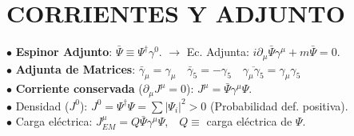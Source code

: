 
\section{CORRIENTES Y ADJUNTO}
$\bullet$ \textbf{Espinor Adjunto}: $\bar{\Psi} \equiv \Psi^\dagger \gamma^0$.
$\rightarrow$ Ec. Adjunta: $i\partial_\mu \bar{\Psi} \gamma^\mu + m\bar{\Psi} = 0$.
\\
$\bullet$ \textbf{Adjunta de Matrices}: $\bar{\gamma}_\mu= \gamma _\mu \quad \bar{\gamma}_5 = - \gamma_5 \quad \overline{\gamma_\mu \gamma_5} = \gamma_\mu \gamma_5$
\\$\bullet$ \textbf{Corriente conservada} ($\partial_\mu J^\mu = 0$): $J^\mu = \bar{\Psi} \gamma^\mu \Psi$.\\
$\bullet$ Densidad ($J^0$): $J^0 = \Psi^\dagger \Psi = \sum |\Psi_i|^2 > 0$ (Probabilidad def. positiva).\\
$\bullet$ Carga eléctrica: $J^\mu_{EM} = Q \bar{\Psi}\gamma^\mu \Psi, \;\;\; Q\equiv$ carga eléctrica de $\Psi$.

